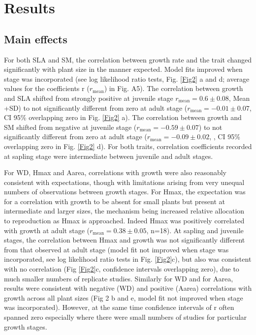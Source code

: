 \documentclass[a4paper]{article}\usepackage[]{graphicx}\usepackage[]{color}
\begin{document}
\section*{Results}\label{results}

\subsection*{Main effects}

For both SLA and SM, the correlation between growth rate and the trait changed significantly with plant size in the manner expected. Model fits improved when stage was incorporated (see log likelihood ratio tests, Fig. \ref{Fig2} a and d; average values for the coefficients r ($r_{\textrm{mean}}$) in Fig. A5). The correlation between growth and SLA shifted from strongly positive at juvenile stage $r_{\textrm{mean}}=0.6 \pm 0.08$, Mean +SD) to not significantly different from zero at adult stage ($r_{\textrm{mean}}= -0.01 \pm 0.07$, CI 95\% overlapping zero in Fig. \ref{Fig2} a). The correlation between growth and SM shifted from negative at juvenile stage ($r_{\textrm{mean}}= -0.59 \pm 0.07$) to not significantly different from zero at adult stage ($r_{\textrm{mean}}= -0.09 \pm 0.02$, , CI 95\% overlapping zero in Fig. \ref{Fig2} d). For both traits,  correlation coefficients recorded at sapling stage were intermediate between juvenile and adult stages. 

For WD, Hmax and Aarea, correlations with growth were also reasonably consistent with expectations, though with limitations arising from very unequal numbers of observations between growth stages. For Hmax, the expectation was for a correlation with growth to be absent for small plants but present at intermediate and larger sizes, the mechanism being increased relative allocation to reproduction as Hmax is approached. Indeed Hmax was positively correlated with growth at adult stage ($r_{\textrm{mean}}= 0.38 \pm 0.05$, n=18). At sapling and juvenile stages, the correlation between Hmax and growth was not significantly different from that observed at adult stage (model fit not improved when stage was incorporated, see log likelihood ratio tests in Fig. \ref{Fig2}c), but also was consistent with no correlation (Fig \ref{Fig2}c, confidence intervals overlapping zero), due to much smaller numbers of replicate studies. Similarly for WD and for Aarea, results were consistent with negative (WD) and positive (Aarea) correlations with growth across all plant sizes (Fig 2 b and e, model fit not improved when stage was incorporated). However, at the same time confidence intervals of r often spanned zero especially where there were small numbers of studies for particular growth stages. 
\end{document}
